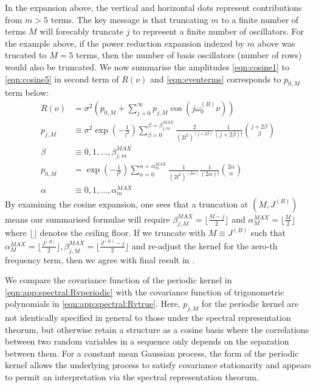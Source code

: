 In the expansion above, the vertical and horizontal dots represent contributions from $m>5$ terms. The key message is that truncating $m$ to a finite number of terms $M$ will forecably truncate $j$ to represent a finite number of oscillators. For the example above, if the power reduction expansion indexed by $m$ above was trucated to $M=5$ terms, then the  number of basis oscillators (number of rows) would also be truncated.  We now summarise the amplitudes \cref{eqn:cosine1} to  \cref{eqn:cosine5} in second term of $R(\nu)$ and  \cref{eqn:eventerms} corresponds to $p_{0,M}$ term below:
\begin{align}
R(\nu) &= \sigma^2 (p_{0,M} + \sum_{j=0}^{\infty} p_{j,M} \cos(j\omega_0^{(B)}  \nu)) \label{eqn:app:spectral:Rvperiodic}\\
p_{j,M} & \equiv \sigma^2 \exp (- \frac{1}{l^2}) \sum_{\beta = 0}^{\beta = \beta_{j,m}^{MAX}} \frac{2}{(2l^2)^{(j + 2\beta)}} \frac{1}{(j + 2\beta)!} \binom{j + 2\beta}{\beta} \label{eqn:beta_series2} \\
\beta &\equiv  0,1,..., \beta_{j,m}^{MAX}  \\
p_{0,M} &= \exp (- \frac{1}{l^2}) \sum_{\alpha = 0}^{\alpha = \alpha_{m}^{MAX}} \frac{1}{(2l^2)^{(2\alpha)}} \frac{1}{(2\alpha)!} \binom{2\alpha}{\alpha} \label{eqn:alpha_series}\\
\alpha &\equiv  0,1,..., \alpha_{m}^{MAX} 
\end{align}
By examining the cosine expansion, one sees that a truncation at $(M, J^{(B)} )$ means our summarised formulae will require $\beta_{j,M}^{MAX} = \lfloor\frac{M-j}{2}\rfloor$ and $\alpha_{M}^{MAX} = \lfloor\frac{M}{2}\rfloor$  where $\lfloor \rfloor$ denotes the ceiling floor. If we truncate with $M \equiv J^{(B)} $ such that $\alpha_{M}^{MAX} = \lfloor\frac{J^{(B)} }{2}\rfloor, \beta_{j,M}^{MAX} =  \lfloor\frac{J^{(B)}-j}{2}\rfloor $ and re-adjust the kernel for the zero-th frequency term, then we agree with final result in \cite{solin2014explicit}.

We compare the covariance function of the periodic kernel in \cref{eqn:app:spectral:Rvperiodic} with the covariance function of trigonometric polynomials in \cref{eqn:app:spectral:Rvtrue}.  Here, $p_{j,M}$ for the periodic kernel are not identically specified in general to those under the spectral representation theorum, but otherwise retain a structure as a cosine basis where the correlations between two random variables in a sequence only depends on the separation between them. For a constant mean Gaussian process, the form of the periodic kernel allows the underlying process to satisfy covariance stationarity and appears to permit an interpretation via the spectral representation theorum.

